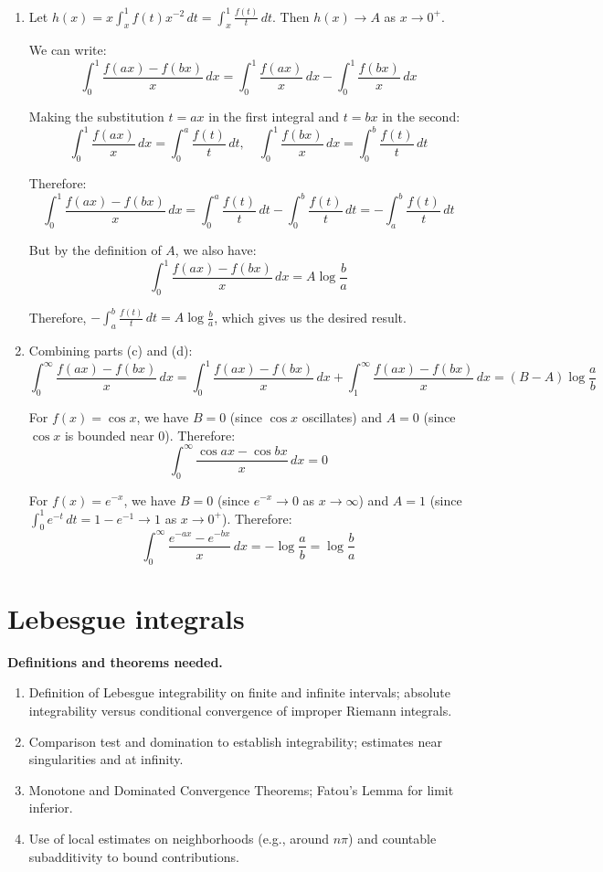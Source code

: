 \begin{enumerate}[label=(\alph*)]
    \item Let $h(x) = x \int_{x}^{1} f(t)x^{-2} \, dt = \int_{x}^{1} \frac{f(t)}{t} \, dt$. Then $h(x) \to A$ as $x \to 0^+$.
    
    We can write:
    \[\int_{0}^{1} \frac{f(ax) - f(bx)}{x} \, dx = \int_{0}^{1} \frac{f(ax)}{x} \, dx - \int_{0}^{1} \frac{f(bx)}{x} \, dx\]
    
    Making the substitution $t = ax$ in the first integral and $t = bx$ in the second:
    \[\int_{0}^{1} \frac{f(ax)}{x} \, dx = \int_{0}^{a} \frac{f(t)}{t} \, dt, \quad \int_{0}^{1} \frac{f(bx)}{x} \, dx = \int_{0}^{b} \frac{f(t)}{t} \, dt\]
    
    Therefore:
    \[\int_{0}^{1} \frac{f(ax) - f(bx)}{x} \, dx = \int_{0}^{a} \frac{f(t)}{t} \, dt - \int_{0}^{b} \frac{f(t)}{t} \, dt = -\int_{a}^{b} \frac{f(t)}{t} \, dt\]
    
    But by the definition of $A$, we also have:
    \[\int_{0}^{1} \frac{f(ax) - f(bx)}{x} \, dx = A \log \frac{b}{a}\]
    
    Therefore, $-\int_{a}^{b} \frac{f(t)}{t} \, dt = A \log \frac{b}{a}$, which gives us the desired result.
    
    \item Combining parts (c) and (d):
    \[\int_{0}^{\infty} \frac{f(ax) - f(bx)}{x} \, dx = \int_{0}^{1} \frac{f(ax) - f(bx)}{x} \, dx + \int_{1}^{\infty} \frac{f(ax) - f(bx)}{x} \, dx = (B - A) \log \frac{a}{b}\]
    
    For $f(x) = \cos x$, we have $B = 0$ (since $\cos x$ oscillates) and $A = 0$ (since $\cos x$ is bounded near 0). Therefore:
    \[\int_{0}^{\infty} \frac{\cos ax - \cos bx}{x} \, dx = 0\]
    
    For $f(x) = e^{-x}$, we have $B = 0$ (since $e^{-x} \to 0$ as $x \to \infty$) and $A = 1$ (since $\int_{0}^{1} e^{-t} \, dt = 1 - e^{-1} \to 1$ as $x \to 0^+$). Therefore:
    \[\int_{0}^{\infty} \frac{e^{-ax} - e^{-bx}}{x} \, dx = -\log \frac{a}{b} = \log \frac{b}{a}\]
\end{enumerate}

\section{Lebesgue integrals}

\noindent\textbf{Definitions and theorems needed.}
\begin{enumerate}[label=(\alph*)]
    \item Definition of Lebesgue integrability on finite and infinite intervals; absolute integrability versus conditional convergence of improper Riemann integrals.
    \item Comparison test and domination to establish integrability; estimates near singularities and at infinity.
    \item Monotone and Dominated Convergence Theorems; Fatou's Lemma for limit inferior.
    \item Use of local estimates on neighborhoods (e.g., around $n\pi$) and countable subadditivity to bound contributions.
\end{enumerate}

